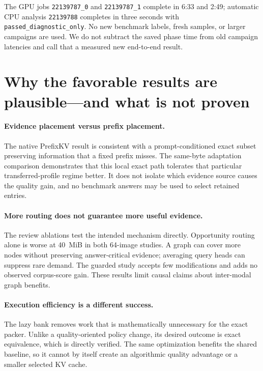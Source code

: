 \documentclass[10pt,letterpaper]{article}
\begin{document}
The GPU jobs \texttt{22139787\_0} and \texttt{22139787\_1} complete in
6:33 and 2:49; automatic CPU analysis \texttt{22139788} completes in
three seconds with \texttt{passed\_diagnostic\_only}. No new benchmark
labels, fresh samples, or larger campaigns are used. We do not subtract
the saved phase time from old campaign latencies and call that a measured
new end-to-end result.



\section{Why the favorable results are plausible---and what is not proven}
\label{sec:interpretation}
\paragraph{Evidence placement versus prefix placement.}
The native PrefixKV result is consistent with a prompt-conditioned exact
subset preserving information that a fixed prefix misses. The same-byte
adaptation comparison demonstrates that this local exact path tolerates
that particular transferred-profile regime better. It does not isolate
which evidence source causes the quality gain, and no benchmark answers
may be used to select retained entries.

\paragraph{More routing does not guarantee more useful evidence.}
The review ablations test the intended mechanism directly. Opportunity
routing alone is worse at 40~MiB in both 64-image studies. A graph can
cover more nodes without preserving answer-critical evidence; averaging
query heads can suppress rare demand. The guarded study accepts few
modifications and adds no observed corpus-score gain. These results
limit causal claims about inter-modal graph benefits.

\paragraph{Execution efficiency is a different success.}
The lazy bank removes work that is mathematically unnecessary for the
exact packer. Unlike a quality-oriented policy change, its desired outcome
is exact equivalence, which is directly verified. The same optimization
benefits the shared baseline, so it cannot by itself create an algorithmic
quality advantage or a smaller selected KV cache.
\end{document}
